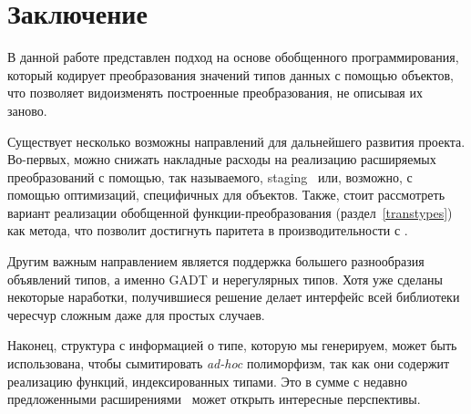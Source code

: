 \section{Заключение}
\label{sec:futurework}

В данной работе представлен подход на основе обобщенного программирования, который кодирует преобразования значений типов данных с помощью объектов, что позволяет видоизменять построенные преобразования, не описывая их заново.

Существует несколько возможны направлений для дальнейшего развития проекта. Во-первых, можно снижать накладные расходы на реализацию расширяемых преобразований 
с помощью, так называемого, staging~\cite{Staged} или, возможно, с помощью оптимизаций, специфичных для объектов. 
Также, стоит рассмотреть вариант реализации обобщенной функции-преобразования (раздел~\ref{transtypes}) как метода, что позволит достигнуть паритета в производительности с \Visitors{}.

Другим важным направлением является поддержка большего разнообразия объявлений типов, а именно GADT и нерегулярных типов. Хотя уже сделаны некоторые наработки, получившиеся решение делает интерфейс всей библиотеки чересчур сложным даже для простых случаев.

Наконец, структура с информацией о типе, которую мы генерируем, может быть использована, чтобы сымитировать \emph{ad-hoc} полиморфизм, так как они содержит реализацию функций, индексированных типами. Это в сумме с недавно предложенными расширениями~\cite{ModularImplicits} может открыть интересные перспективы.


